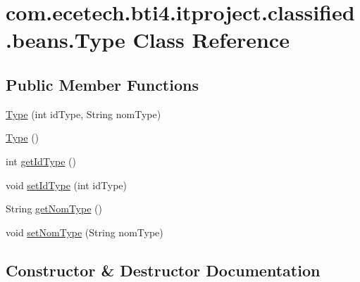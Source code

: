 \hypertarget{classcom_1_1ecetech_1_1bti4_1_1itproject_1_1classified_1_1beans_1_1_type}{}\section{com.\+ecetech.\+bti4.\+itproject.\+classified.\+beans.\+Type Class Reference}
\label{classcom_1_1ecetech_1_1bti4_1_1itproject_1_1classified_1_1beans_1_1_type}
\subsection*{Public Member Functions}
\begin{DoxyCompactItemize}
\item 
\hyperlink{classcom_1_1ecetech_1_1bti4_1_1itproject_1_1classified_1_1beans_1_1_type_a2eb75ec9d297f6068d5876399d3762ff}{Type} (int id\+Type, String nom\+Type)
\item 
\hyperlink{classcom_1_1ecetech_1_1bti4_1_1itproject_1_1classified_1_1beans_1_1_type_adf5675b885b9b022b4fa47c96c0e1dd6}{Type} ()
\item 
int \hyperlink{classcom_1_1ecetech_1_1bti4_1_1itproject_1_1classified_1_1beans_1_1_type_a19eef86aaf345536fbf7cf6907f818f4}{get\+Id\+Type} ()
\item 
void \hyperlink{classcom_1_1ecetech_1_1bti4_1_1itproject_1_1classified_1_1beans_1_1_type_a2db24270c028fe2749017260bf8eba4a}{set\+Id\+Type} (int id\+Type)
\item 
String \hyperlink{classcom_1_1ecetech_1_1bti4_1_1itproject_1_1classified_1_1beans_1_1_type_a2d201d59213e7f3663149f3a00642dcc}{get\+Nom\+Type} ()
\item 
void \hyperlink{classcom_1_1ecetech_1_1bti4_1_1itproject_1_1classified_1_1beans_1_1_type_affc178ef83dd89857a2b3063bfef2279}{set\+Nom\+Type} (String nom\+Type)
\end{DoxyCompactItemize}


\subsection{Constructor \& Destructor Documentation}
